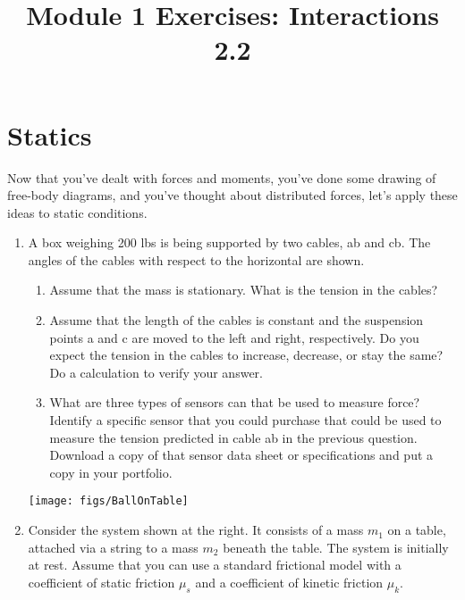 \documentclass{tufte-handout}
\title{Module 1 Exercises: Interactions 2.2}
\newcommand{\be}{\begin{enumerate}}
\newcommand{\ee}{\end{enumerate}}
\begin{document}
\maketitle



\section{Statics}

Now that you've dealt with forces and moments,  you've done some drawing of free-body diagrams, and you've thought about distributed forces, let's apply these ideas to static conditions.

\begin{enumerate}[resume]


\begin{marginfigure} 
\texttt{[image: figs/Inter1\_boxhang.jpg]}
\end{marginfigure}

\item A box weighing 200 lbs is being supported by two cables, ab and cb. The angles of the cables with respect to the horizontal are shown. 
\be
\item Assume that the mass is stationary.  What is the tension in the cables?
\item Assume that the length of the cables is constant and the suspension points a and c are moved to the left and right, respectively. Do you expect the tension in the cables to increase, decrease, or stay the same? Do a calculation to verify your answer. 
\item What are three types of sensors can that be used to measure force? Identify a specific sensor that you could purchase that could be used to measure the tension predicted in cable ab in the previous question. Download a copy of that sensor data sheet or specifications and put a copy in your portfolio. 
\ee

\vfill
\begin{marginfigure} 
\texttt{[image: figs/BallOnTable]}
\end{marginfigure}
\item Consider the system shown at the right.  It consists of a mass $m_1$ on a table, attached via a string to a mass $m_2$ beneath the table.  The system is initially at rest.  Assume that you can use a standard frictional model with a coefficient of static friction $\mu_s$ and a coefficient of kinetic friction $\mu_k$.




\end{enumerate}
\end{document}
